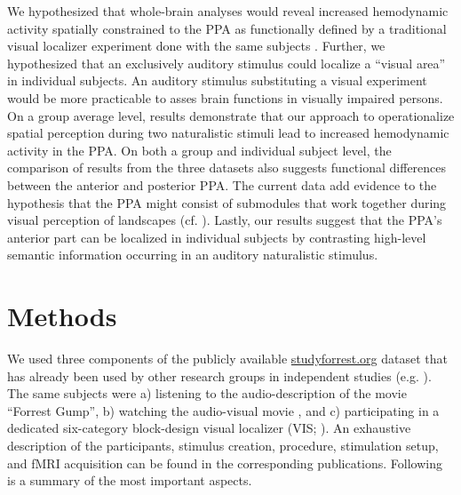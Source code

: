 \documentclass[english]{article}
\begin{document}
We hypothesized that whole-brain analyses would reveal increased hemodynamic
activity spatially constrained to the PPA as functionally defined by a
traditional visual localizer experiment done with the same subjects
\citep{sengupta2016extension}.
Further, we hypothesized that an exclusively auditory stimulus could localize a
``visual area'' in individual subjects.
An auditory stimulus substituting a visual experiment would be more practicable
to asses brain functions in visually impaired persons.
On a group average level,
results demonstrate that our approach to operationalize spatial perception
during two naturalistic stimuli lead to increased hemodynamic activity in the
PPA.
On both a group and individual subject level, the comparison of results from the
three datasets also suggests functional differences between the anterior and
posterior PPA.
The current data add evidence to the hypothesis that the PPA might consist of
submodules that work together during visual perception of landscapes (cf.
\citep{baldassano2013differential}).
%
Lastly, our results suggest that the PPA's anterior part can be localized in
individual subjects by contrasting high-level semantic information occurring in
an auditory naturalistic stimulus.


\section{Methods}


We used three components of the publicly available
\href{http://www.studyforrest.org}{studyforrest.org} dataset that has already
been used by other research groups in independent studies (e.g.
\citep{ben2018hippocampal, jiahui2019predicting, hu2017decoding,
lettieri2019emotionotopy, nguyen2016integration}).
The same subjects were
a) listening to the audio-description \citep{hanke2014audiomovie} of
the movie ``Forrest Gump'',
b) watching the audio-visual movie \citep{hanke2016simultaneous}, and
c) participating in a dedicated six-category block-design visual localizer (VIS; \citep{sengupta2016extension}).
An exhaustive description of the participants, stimulus creation, procedure,
stimulation setup, and fMRI acquisition can be found in the corresponding
publications. Following is a summary of the most important aspects.
\end{document}
